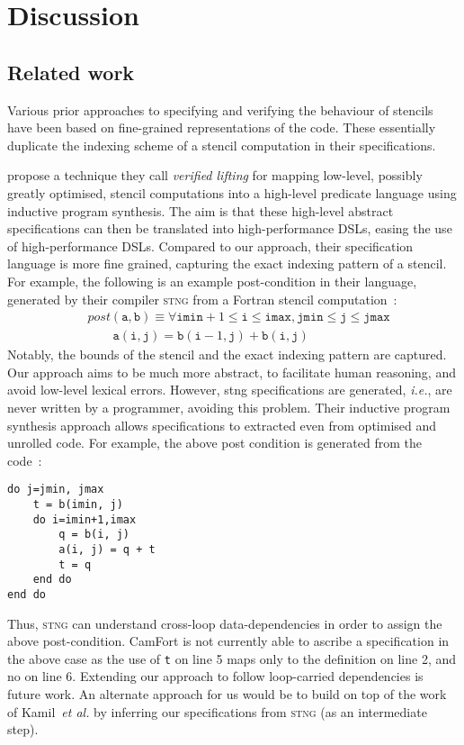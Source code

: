 \documentclass[9pt]{sigplanconf}
\theoremstyle{definition}
\newcommand{\ie}{\emph{i.e.}}
\begin{document}
\section{Discussion}
\label{sec:discussion}

\subsection{Related work}

Various prior approaches to specifying and verifying the behaviour
of stencils have been based on fine-grained representations of the
code. These essentially duplicate the indexing scheme of a stencil
computation in their specifications.

\citet{kamil2016verified} propose a technique they call
\emph{verified lifting} for mapping low-level, possibly
greatly optimised, stencil computations into a high-level
predicate language using inductive program synthesis.
The aim is that these high-level abstract specifications can
then be translated into high-performance DSLs, easing the
use of high-performance DSLs. Compared to our approach,
their specification language is more fine grained, capturing
the exact indexing pattern of a stencil. For example, the following
is an example post-condition in their language, generated by their
compiler \textsc{stng} from a Fortran stencil computation~\cite [p.3]{kamil2016verified}:
%
\begin{align*}
& \textit{post}(\texttt{a}, \texttt{b}) \equiv \forall \texttt{imin}+1
\leq \texttt{i} \leq \texttt{imax}, \texttt{jmin} \leq \texttt{j} \leq
\texttt{jmax} \\
& \qquad \texttt{a}(\texttt{i},\texttt{j}) =
\texttt{b}(\texttt{i}-1,\texttt{j}) + \texttt{b}(\texttt{i},\texttt{j})
\end{align*}
%
Notably, the bounds of the stencil and the exact indexing pattern
are captured. Our approach aims to be much more abstract, to
facilitate human reasoning, and avoid low-level lexical
errors. However, \textsf{stng} specifications are generated, \ie{},
are never written by a programmer, avoiding this
problem. Their inductive program synthesis approach allows
specifications to extracted even from optimised and unrolled code. For
example, the above post condition is generated from the code~\cite [p.3]{kamil2016verified}:
%
\begin{verbatim}
do j=jmin, jmax
    t = b(imin, j)
    do i=imin+1,imax
        q = b(i, j)
        a(i, j) = q + t
        t = q
    end do
end do
\end{verbatim}
%
Thus, \textsc{stng} can understand cross-loop data-dependencies
in order to assign the above post-condition. CamFort is not currently
able to ascribe a specification in the above case as the use of
\texttt{t} on line 5 maps only to the definition on line 2, and no on
line 6. Extending our approach to follow loop-carried dependencies is
future work. An alternate approach for us would be to build on top of
the work of Kamil~\emph{et al.} by inferring our specifications from
\textsc{stng} (as an intermediate step).
\end{document}
